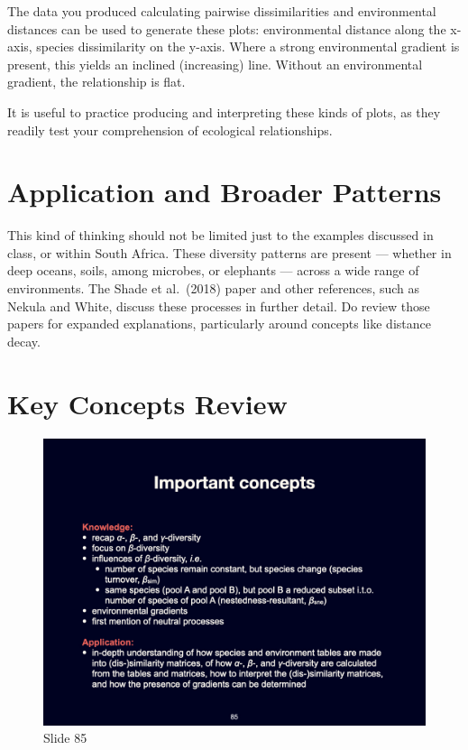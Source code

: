 \documentclass[
  10pt,
]{book}
\begin{document}
The data you produced calculating pairwise dissimilarities and
environmental distances can be used to generate these plots:
environmental distance along the x-axis, species dissimilarity on the
y-axis. Where a strong environmental gradient is present, this yields an
inclined (increasing) line. Without an environmental gradient, the
relationship is flat.

It is useful to practice producing and interpreting these kinds of
plots, as they readily test your comprehension of ecological
relationships.

\section{Application and Broader
Patterns}\label{application-and-broader-patterns}

This kind of thinking should not be limited just to the examples
discussed in class, or within South Africa. These diversity patterns are
present --- whether in deep oceans, soils, among microbes, or elephants
--- across a wide range of environments. The Shade et al.~(2018) paper
and other references, such as Nekula and White, discuss these processes
in further detail. Do review those papers for expanded explanations,
particularly around concepts like distance decay.

\section{Key Concepts Review}\label{key-concepts-review}

\begin{figure}[ht]
\centering
\includegraphics[width=0.8\linewidth]{../images/BDC334/BDC334-085.jpeg}
\caption*{Slide 85}
\end{figure}
\end{document}
